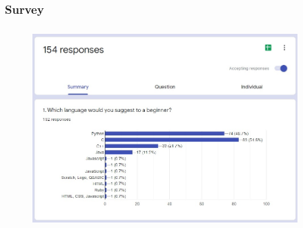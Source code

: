 \documentclass[14pt]{beamer}
\begin{document}
\begin{frame}
     \frametitle{Survey}
     \begin{figure}[htbp]
         \centerline{\includegraphics[width=4in, height=3in]{./logos/form.jpeg}}
         \begin{spacing}{0.25}
         \end{spacing}
     \end{figure}
 \end{frame}
\end{document}
